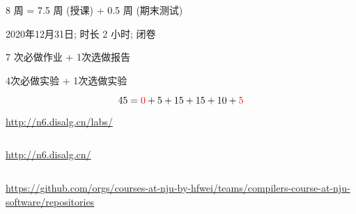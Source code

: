
\begin{frame}{}
  \begin{center}
    {\large 8 周 = 7.5 周 (授课) + 0.5 周 (期末测试)}
  \end{center}

\end{frame}

\begin{frame}{}
  \begin{center}
     2020年12月31日; 时长 2 小时; 闭卷
    \vspace{1.00cm}

     7 次必做作业 + 1次选做报告 

    \vspace{1.00cm}
     4次必做实验 + 1次选做实验 
  \end{center}
\end{frame}

\begin{frame}{}
  \[
    45 = \textcolor{red}{0} + 5 + 15 + 15 + 10 + \textcolor{red}{5}
  \]

  \vspace{0.30cm}
  \begin{center}
    \url{http://n6.disalg.cn/labs/}
  \end{center}
\end{frame}

\begin{frame}{}

  \vspace{0.30cm}
  \begin{center}
  \end{center}
\end{frame}

\begin{frame}{}
  \begin{columns}
      \begin{center}
        \url{http://n6.disalg.cn/}
      \end{center}
  \end{columns}

  \begin{center}
    \url{https://github.com/orgs/courses-at-nju-by-hfwei/teams/compilers-course-at-nju-software/repositories}
  \end{center}
\end{frame}

